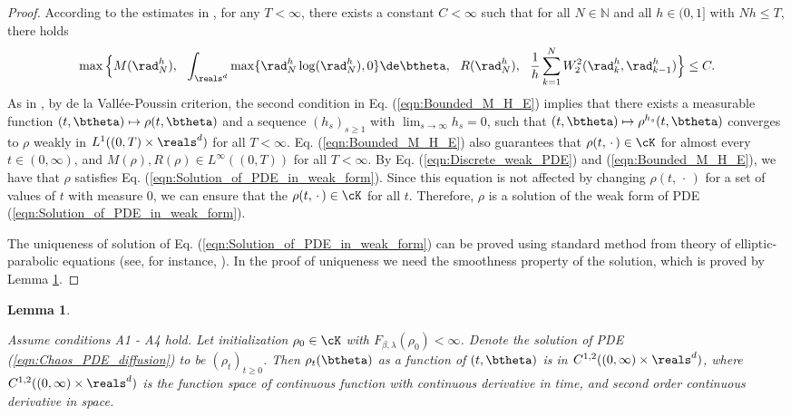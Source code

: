 \documentclass[11pt]{article}
\newtheorem{lemma}{Lemma}
\begin{document}
\begin{proof}
According to the estimates in \cite[Theorem 5.1]{jordan1998variational}, for any $T < \infty$, there exists a constant $C < \infty$ such that for all $N \in \mathbb N$ and all $h \in (0,1]$ with $N h\le T$, there holds
\begin{align}\label{eqn:Bounded_M_H_E}
\max\Big\{ M(\rad_N^h), ~~ \int_{\reals^d} \max \{ \rad_N^h \log(\rad_N^h), 0 \} \de \btheta, ~~ R(\rad_N^h), ~~ \frac{1}{h} \sum_{k=1}^N W_2^2(\rad_k^h, \rad_{k-1}^h) \Big\} \le C. 
\end{align}
As in \cite[Theorem 5.1]{jordan1998variational}, by de la Vall\'ee-Poussin criterion, the second condition in Eq. (\ref{eqn:Bounded_M_H_E}) implies that  there exists a measurable function $(t,\btheta)\mapsto
\rho(t,\btheta)$ and a sequence $(h_s)_{s \ge 1}$ with $\lim_{s \to \infty} h_s = 0$, such that $(t,\btheta)\mapsto \rho^{h_s}(t,\btheta)$ converges to $\rho$ weakly in $L^1((0, T) \times \reals^d)$ for all $T < \infty$.
Eq. (\ref{eqn:Bounded_M_H_E}) also guarantees that $\rho(t,\, \cdot\, ) \in \cK$ for almost every $t \in (0, \infty)$, and $M(\rho), R(\rho) \in L^\infty((0, T))$ 
for all $T < \infty$. By Eq. (\ref{eqn:Discrete_weak_PDE}) and (\ref{eqn:Bounded_M_H_E}), we have that $\rho$ satisfies Eq. (\ref{eqn:Solution_of_PDE_in_weak_form}). 
Since this equation is not affected by changing $\rho(t,\,\cdot\,)$ for a set of values of $t$ with measure $0$, we can ensure that the $\rho(t,\,\cdot\,)\in \cK$
for all $t$. Therefore, $\rho$ is a solution of the weak form of PDE (\ref{eqn:Solution_of_PDE_in_weak_form}). 


The uniqueness of solution of Eq. (\ref{eqn:Solution_of_PDE_in_weak_form}) can be proved using standard method from theory of elliptic-parabolic equations (see, for instance, \cite[Theorem 5.1]{jordan1998variational}). In the proof of uniqueness we need the smoothness property of the solution, which is proved by Lemma \ref{lem:smoothness_of_DD_diffusion_PDE}. 


\end{proof}



\begin{lemma}\label{lem:smoothness_of_DD_diffusion_PDE}

Assume conditions {\sf A1} - {\sf A4} hold. Let initialization $\rho_0 \in \cK$ with $F_{\beta, \lambda}(\rho_0) < \infty$. Denote the solution of PDE (\ref{eqn:Chaos_PDE_diffusion}) to be $(\rho_t)_{t \ge 0}$. Then $\rho_t(\btheta)$ as a function of $(t, \btheta)$ is in $C^{1, 2}((0, \infty) \times \reals^d)$, where $C^{1, 2} ((0, \infty) \times \reals^d)$ is the function space of continuous function with continuous derivative in time, and second order continuous derivative in space.  

\end{lemma}
\end{document}
